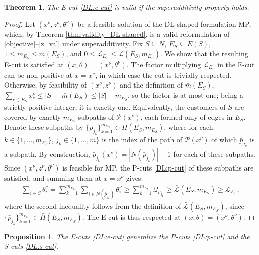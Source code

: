 \documentclass{article}
\newtheorem{theorem}{Theorem}
\newtheorem{proposition}{Proposition}
\newcommand{\rev}[1]{{\color{black}#1}}
\begin{document}
\begin{theorem}\label{thm:validity_E-cuts}
The E-cut \eqref{DL:e-cut} is valid if the superadditivity property holds.
\end{theorem}
\begin{proof}
\rev{Let $(x^{\nu},z^{\nu},\theta^{\nu})$ be a feasible solution of the DL-shaped formulation MP, which, by Theorem \ref{thm:validity_DL-shaped}, is a valid reformulation of \eqref{objective}--\eqref{z_val} under superadditivity. Fix $S \subseteq N$, $E_S \subseteq E(S)$, $1 \leq m_{E_S} \leq \bar{m}(E_S)$, and $0 \leq \mathcal{L}_{E_S}\leq \bar{\mathcal{L}}(E_S, m_{E_S})$. We show that the resulting E-cut is satisfied at $(x,\theta) = (x^{\nu},\theta^{\nu})$.
The factor multiplying $\mathcal{L}_{E_S}$ in the E-cut can be non-positive at $x=x^\nu$, in which case the cut is trivially respected. Otherwise, by feasibility of $(x^\nu,z^\nu)$ and the definition of $\bar m(E_S)$, $\sum_{e \in E_S} x^\nu_e \leq |S|-\bar m(E_S) \leq |S|-m_{E_S}$, so the factor is at most one; being a strictly positive integer, it is exactly one. Equivalently, the customers of $S$ are covered by exactly $m_{E_S}$ subpaths of $\mathcal{P}(x^\nu)$, each formed only of edges in $E_S$. Denote these subpaths by $\{\bar{p}_{j_k}\}_{k=1}^{m_{E_S}} \in \bar{\Pi}(E_S,m_{E_S})$, where for each $k \in \{1,\dots,m_{E_S}\}$, $j_k \in \{1,\dots,m\}$ is the index of the path of $\mathcal{P}(x^\nu)$ of which $\bar{p}_{j_k}$ is a subpath.
By construction, $\bar{p}_{j_k}(x^\nu)=|N(\bar{p}_{j_k})|-1$ for each of these subpaths. Since $(x^\nu,z^\nu,\theta^\nu)$ is feasible for MP, the P-cuts \eqref{DL:p-cut} of these subpaths are satisfied, and summing them at $x=x^\nu$ gives:
\begin{align*}
    \sum_{i \in S}\theta^{\nu}_i
    = \sum_{k=1}^{m_{E_S}}\sum_{i \in N(\bar{p}_{j_k})} \theta^{\nu}_i
    \geq \sum_{k=1}^{m_{E_S}} \mathcal{Q}_{\bar{p}_{j_k}}
    \geq \bar{\mathcal{L}}(E_S, m_{E_S})
    \geq \mathcal{L}_{E_S},
\end{align*}
where the second inequality follows from the definition of $\bar{\mathcal{L}}(E_S, m_{E_S})$, since $\{\bar{p}_{j_k}\}_{k=1}^{m_{E_S}} \in \bar{\Pi}(E_S,m_{E_S})$. The E-cut is thus respected at $(x,\theta)=(x^\nu,\theta^\nu)$.}

\end{proof}

\begin{proposition}\label{prop:E-cuts-generalize}
The E-cuts \eqref{DL:e-cut} generalize the P-cuts \eqref{DL:p-cut} and the S-cuts \eqref{DL:s-cut}.
\end{proposition}
\end{document}
